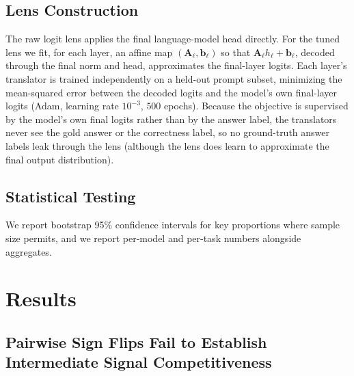 \documentclass{article} %
\begin{document}
\subsection{Lens Construction}
The raw logit lens applies the final language-model head directly. For the tuned lens \citep{belrose2023tunedlens} we fit, for each layer, an affine map $(\mathbf{A}_\ell, \mathbf{b}_\ell)$ so that $\mathbf{A}_\ell h_\ell + \mathbf{b}_\ell$, decoded through the final norm and head, approximates the final-layer logits. Each layer's translator is trained independently on a held-out prompt subset, minimizing the mean-squared error between the decoded logits and the model's own final-layer logits (Adam, learning rate $10^{-3}$, $500$ epochs). Because the objective is supervised by the model's own final logits rather than by the answer label, the translators never see the gold answer or the correctness label, so no ground-truth answer labels leak through the lens (although the lens does learn to approximate the final output distribution).

\subsection{Statistical Testing}
We report bootstrap 95\% confidence intervals for key proportions where sample size permits, and we report per-model and per-task numbers alongside aggregates.

\section{Results}

\subsection{Pairwise Sign Flips Fail to Establish Intermediate Signal Competitiveness}
\end{document}
